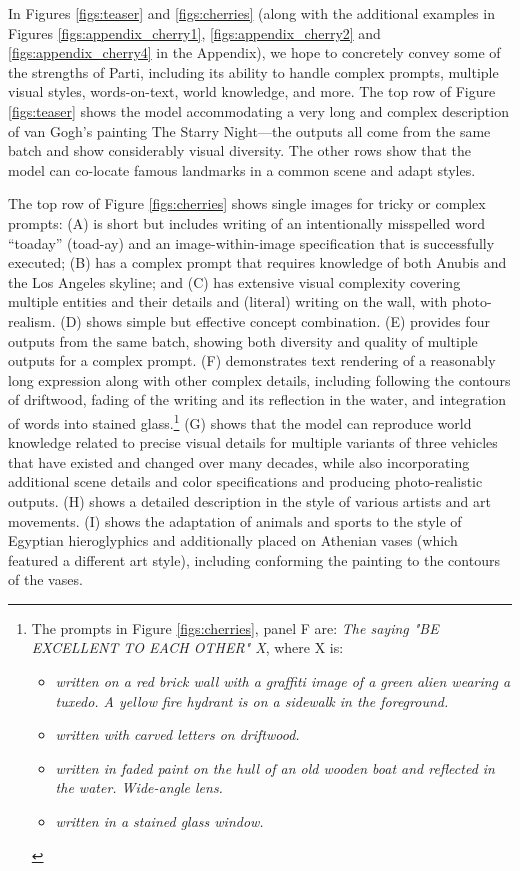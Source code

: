 In Figures \ref{figs:teaser} and \ref{figs:cherries} (along with the additional examples in Figures \ref{figs:appendix_cherry1}, \ref{figs:appendix_cherry2} and \ref{figs:appendix_cherry4} in the Appendix), we hope to concretely convey some of the strengths of Parti, including its ability to handle complex prompts, multiple visual styles, words-on-text, world knowledge, and more. The top row of Figure \ref{figs:teaser} shows the model accommodating a very long and complex description of van Gogh's painting The Starry Night---the outputs all come from the same batch and show considerably visual diversity. The other rows show that the model can co-locate famous landmarks in a common scene and adapt styles.

The top row of Figure \ref{figs:cherries} shows single images for tricky or complex prompts: (A) is short but includes writing of an intentionally misspelled word ``toaday'' (toad-ay) and an image-within-image specification that is successfully executed; (B) has a complex prompt that requires knowledge of both Anubis and the Los Angeles skyline; and (C) has extensive visual complexity covering multiple entities and their details and (literal) writing on the wall, with photo-realism. (D) shows simple but effective concept combination. (E) provides four outputs from the same batch, showing both diversity and quality of multiple outputs for a complex prompt. (F) demonstrates text rendering of a reasonably long expression along with other complex details, including following the contours of driftwood, fading of the writing and its reflection in the water, and integration of words into stained glass.\footnote{The prompts in Figure \ref{figs:cherries}, panel F are: \textit{The saying "BE EXCELLENT TO EACH OTHER" X}, where X is:

\begin{itemize}[itemsep=0.5pt]
    \item \textit{written on a red brick wall with a graffiti image of a green alien wearing a tuxedo. A yellow fire hydrant is on a sidewalk in the foreground.}
    \item \textit{written with carved letters on driftwood.}
    \item \textit{written in faded paint on the hull of an old wooden boat and reflected in the water. Wide-angle lens.}
    \item \textit{written in a stained glass window.} \end{itemize}

} (G) shows that the model can reproduce world knowledge related to precise visual details for multiple variants of three vehicles that have existed and changed over many decades, while also incorporating additional scene details and color specifications and producing photo-realistic outputs. (H) shows a detailed description in the style of various artists and art movements. (I) shows the adaptation of animals and sports to the style of Egyptian hieroglyphics and additionally placed on Athenian vases (which featured a different art style), including conforming the painting to the contours of the vases.

